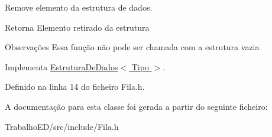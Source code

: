 Remove elemento da estrutura de dados. 

\begin{DoxyReturn}{Retorna}
Elemento retirado da estrutura
\end{DoxyReturn}
\begin{DoxyRemark}{Observações}
Essa função não pode ser chamada com a estrutura vazia 
\end{DoxyRemark}


Implementa \hyperlink{classEstruturaDeDados_a01ddc5aec2e4a425e4021055c15e7f02}{Estrutura\-De\-Dados$<$ Tipo $>$}.



Definido na linha 14 do ficheiro Fila.\-h.



A documentação para esta classe foi gerada a partir do seguinte ficheiro\-:\begin{DoxyCompactItemize}
\item 
Trabalho\-E\-D/src/include/Fila.\-h\end{DoxyCompactItemize}
